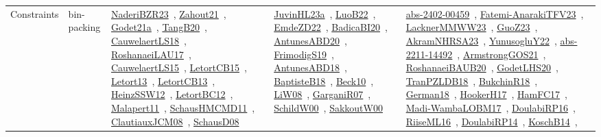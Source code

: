 {\begin{longtable}{lp{3cm}>{\raggedright\arraybackslash}p{6cm}>{\raggedright\arraybackslash}p{6cm}>{\raggedright\arraybackslash}p{8cm}}
Constraints & bin-packing & \href{../works/NaderiBZR23.pdf}{NaderiBZR23}~\cite{NaderiBZR23}, \href{../works/Zahout21.pdf}{Zahout21}~\cite{Zahout21}, \href{../works/Godet21a.pdf}{Godet21a}~\cite{Godet21a}, \href{../works/TangB20.pdf}{TangB20}~\cite{TangB20}, \href{../works/CauwelaertLS18.pdf}{CauwelaertLS18}~\cite{CauwelaertLS18}, \href{../works/RoshanaeiLAU17.pdf}{RoshanaeiLAU17}~\cite{RoshanaeiLAU17}, \href{../works/CauwelaertLS15.pdf}{CauwelaertLS15}~\cite{CauwelaertLS15}, \href{../works/LetortCB15.pdf}{LetortCB15}~\cite{LetortCB15}, \href{../works/Letort13.pdf}{Letort13}~\cite{Letort13}, \href{../works/LetortCB13.pdf}{LetortCB13}~\cite{LetortCB13}, \href{../works/HeinzSSW12.pdf}{HeinzSSW12}~\cite{HeinzSSW12}, \href{../works/LetortBC12.pdf}{LetortBC12}~\cite{LetortBC12}, \href{../works/Malapert11.pdf}{Malapert11}~\cite{Malapert11}, \href{../works/SchausHMCMD11.pdf}{SchausHMCMD11}~\cite{SchausHMCMD11}, \href{../works/ClautiauxJCM08.pdf}{ClautiauxJCM08}~\cite{ClautiauxJCM08}, \href{../works/SchausD08.pdf}{SchausD08}~\cite{SchausD08} & \href{../works/JuvinHL23a.pdf}{JuvinHL23a}~\cite{JuvinHL23a}, \href{../works/LuoB22.pdf}{LuoB22}~\cite{LuoB22}, \href{../works/EmdeZD22.pdf}{EmdeZD22}~\cite{EmdeZD22}, \href{../works/BadicaBI20.pdf}{BadicaBI20}~\cite{BadicaBI20}, \href{../works/AntunesABD20.pdf}{AntunesABD20}~\cite{AntunesABD20}, \href{../works/FrimodigS19.pdf}{FrimodigS19}~\cite{FrimodigS19}, \href{../works/AntunesABD18.pdf}{AntunesABD18}~\cite{AntunesABD18}, \href{../works/BaptisteB18.pdf}{BaptisteB18}~\cite{BaptisteB18}, \href{../works/Beck10.pdf}{Beck10}~\cite{Beck10}, \href{../works/LiW08.pdf}{LiW08}~\cite{LiW08}, \href{../works/GarganiR07.pdf}{GarganiR07}~\cite{GarganiR07}, \href{../works/SchildW00.pdf}{SchildW00}~\cite{SchildW00}, \href{../works/SakkoutW00.pdf}{SakkoutW00}~\cite{SakkoutW00} & \href{../works/abs-2402-00459.pdf}{abs-2402-00459}~\cite{abs-2402-00459}, \href{../works/Fatemi-AnarakiTFV23.pdf}{Fatemi-AnarakiTFV23}~\cite{Fatemi-AnarakiTFV23}, \href{../works/LacknerMMWW23.pdf}{LacknerMMWW23}~\cite{LacknerMMWW23}, \href{../works/GuoZ23.pdf}{GuoZ23}~\cite{GuoZ23}, \href{../works/AkramNHRSA23.pdf}{AkramNHRSA23}~\cite{AkramNHRSA23}, \href{../works/YunusogluY22.pdf}{YunusogluY22}~\cite{YunusogluY22}, \href{../works/abs-2211-14492.pdf}{abs-2211-14492}~\cite{abs-2211-14492}, \href{../works/ArmstrongGOS21.pdf}{ArmstrongGOS21}~\cite{ArmstrongGOS21}, \href{../works/RoshanaeiBAUB20.pdf}{RoshanaeiBAUB20}~\cite{RoshanaeiBAUB20}, \href{../works/GodetLHS20.pdf}{GodetLHS20}~\cite{GodetLHS20}, \href{../works/TranPZLDB18.pdf}{TranPZLDB18}~\cite{TranPZLDB18}, \href{../works/BukchinR18.pdf}{BukchinR18}~\cite{BukchinR18}, \href{../works/German18.pdf}{German18}~\cite{German18}, \href{../works/HookerH17.pdf}{HookerH17}~\cite{HookerH17}, \href{../works/HamFC17.pdf}{HamFC17}~\cite{HamFC17}, \href{../works/Madi-WambaLOBM17.pdf}{Madi-WambaLOBM17}~\cite{Madi-WambaLOBM17}, \href{../works/DoulabiRP16.pdf}{DoulabiRP16}~\cite{DoulabiRP16}, \href{../works/RiiseML16.pdf}{RiiseML16}~\cite{RiiseML16}, \href{../works/DoulabiRP14.pdf}{DoulabiRP14}~\cite{DoulabiRP14}, \href{../works/KoschB14.pdf}{KoschB14}~\cite{KoschB14}, 
\end{longtable}}
